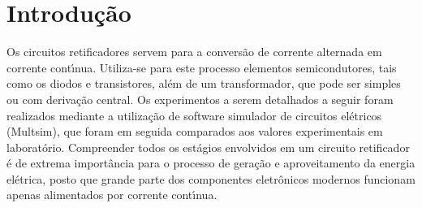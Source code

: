 \chapter*[Introdu\c{c}\~{a}o]{Introdu\c{c}\~{a}o}
Os circuitos retificadores servem para a convers\~{a}o de corrente alternada em corrente cont\'{\i}nua. Utiliza-se para este processo elementos semicondutores, tais como os diodos e transistores, al\'{e}m de um transformador, que pode ser simples ou com deriva\c{c}\~{a}o central. Os experimentos a serem detalhados a seguir foram realizados mediante a utiliza\c{c}\~{a}o de software simulador de circuitos el\'{e}tricos (Multsim), que foram em seguida comparados aos valores experimentais em laborat\'{o}rio. Compreender todos os est\'{a}gios envolvidos em um circuito retificador \'{e} de extrema import\^{a}ncia para o processo de gera\c{c}\~{a}o e aproveitamento da energia el\'{e}trica, posto que grande parte dos componentes eletr\^{o}nicos modernos funcionam apenas alimentados por corrente cont\'{\i}nua. 